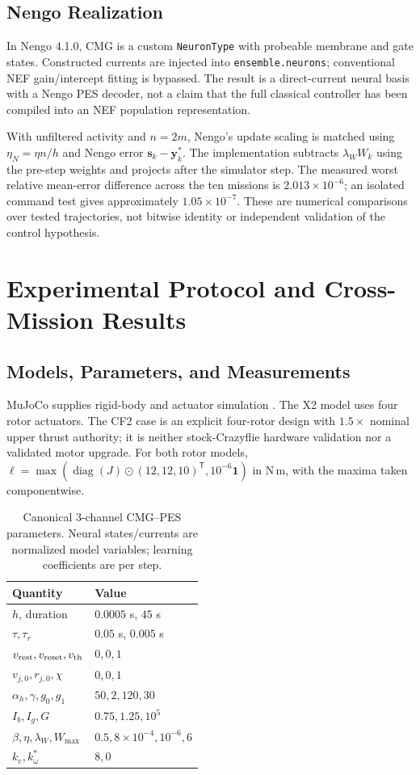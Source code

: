 \documentclass[letterpaper,10pt,conference]{IEEEtran}
\newcommand{\T}{^{\mathsf T}}
\begin{document}
\subsection{Nengo Realization}
In Nengo 4.1.0, CMG is a custom \texttt{NeuronType} with
probeable membrane and gate states. Constructed currents are injected into
\texttt{ensemble.neurons}; conventional NEF gain/intercept fitting is
bypassed. The result is a direct-current neural basis with a Nengo PES
decoder, not a claim that the full classical controller has been compiled
into an NEF population representation.

With unfiltered activity and $n=2m$, Nengo's update scaling is matched using
$\eta_N=\eta n/h$ and Nengo error $\bm s_k-\bm y_k^*$.
The implementation subtracts $\lambda_WW_k$ using the pre-step weights
and projects after the simulator step. The measured worst relative
mean-error difference across the ten missions is $2.013\times10^{-6}$;
an isolated command test gives approximately $1.05\times10^{-7}$.
These are numerical comparisons over tested trajectories, not bitwise
identity or independent validation of the control hypothesis.

\section{Experimental Protocol and Cross-Mission Results}
\label{sec:results}
\subsection{Models, Parameters, and Measurements}
MuJoCo supplies rigid-body and actuator simulation \cite{todorov2012mujoco}.
The X2 model uses four rotor actuators. The CF2 case is an explicit
four-rotor design with $1.5\times$ nominal upper thrust authority; it is
neither stock-Crazyflie hardware validation nor a validated motor upgrade.
For both rotor models,
$\bm\ell=\max(\operatorname{diag}(J)\odot(12,12,10)\T,10^{-6}\bm1)$
in N\,m, with the maxima taken componentwise.



\begin{table}[t]
\caption{Canonical 3-channel CMG--PES parameters. Neural states/currents
are normalized model variables; learning coefficients are per step.}
\label{tab:parameters}\centering\small
\begin{tabular}{ll}
\toprule
Quantity & Value\\\midrule
$h$, duration & $0.0005$ s, $45$ s\\
$\tau,\tau_r$ & $0.05$ s, $0.005$ s\\
$v_{\rm rest},v_{\rm reset},v_{\rm th}$ & $0,0,1$\\
$v_{j,0},r_{j,0},\chi$ & $0,0,1$\\
$\alpha_h,\gamma,g_0,g_1$ & $50,2,120,30$\\
$I_b,I_g,G$ & $0.75,1.25,10^5$\\
$\beta,\eta,\lambda_W,W_{\max}$ & $0.5,8\times10^{-4},10^{-6},6$\\
$k_e,k_\omega^*$ & $8,0$\\
\bottomrule
\end{tabular}
\end{table}
\end{document}
